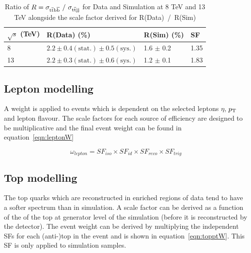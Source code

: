 \begin{table}[htpb!]
\footnotesize
\begin{center}
\begin{tabular}{|l|l|l|l|}
\hline
$\sqrt{s}$ (TeV)                         & R(Data)  (\%)                                                                             & R(Sim) (\%)       & SF   \\
\hline
8~\cite{Khachatryan2015132}  & $2.2 \pm 0.4 \left( \textrm{stat.} \right) \pm 0.5 \left(\textrm{sys.} \right)$ & 1.6 $\pm$ 0.2 & 1.35 \\
13~\cite{CMS-PAS-TOP-16-010} & $2.2 \pm 0.3 \left( \textrm{stat.} \right) \pm 0.6 \left(\textrm{sys.} \right)$ & 1.2 $\pm$ 0.1 & 1.83 \\
\hline
\end{tabular}
\caption{Ratio of $R= \sigma_{\mathrm{t}\overline{\mathrm{t}}\mathrm{b}\overline{\mathrm{b}}}~/~ \sigma_{\mathrm{t}\overline{\mathrm{t}} \textrm{jj} }$ for Data and Simulation at 8 TeV and 13 TeV alongside the scale factor derived for R(Data)~/~R(Sim)}
\label{tab:heavyflavR}
\end{center}
\end{table}

\subsection{Lepton modelling}
A weight is applied to events which is dependent on the selected leptons $\eta$, $p_{\mathrm{T}}$ and lepton flavour. The scale factors for each source of efficiency are designed to be multiplicative and the final event weight can be found in equation~\ref{eqn:leptonW}

\begin{equation}
\omega_{lepton} = SF_{iso}\times SF_{id}\times SF_{reco}\times SF_{trig}
\label{eqn:leptonW}
\end{equation}

\subsection{Top \pt modelling}

The top quarks which are reconstructed in \ttbar enriched regions of data tend to have a softer \pt spectrum than in \ttbar simulation. A scale factor can be derived as a function of the \pt of the top at generator level of the simulation (before it is reconstructed by the detector). The event weight can be derived by multiplying the independent SFs for each (anti-)top in the event and is shown in equation~\ref{eqn:topptW}. This SF is only applied to \ttbar simulation samples.

